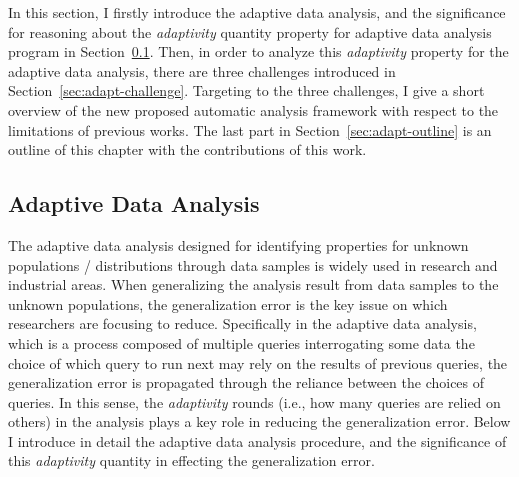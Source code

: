 In this section, 
I firstly introduce the adaptive data analysis, and the
significance for reasoning about the \emph{adaptivity} quantity property 
for adaptive data analysis program in Section~\ref{sec:adapt-background}.
Then, in order to analyze this \emph{adaptivity} property for the adaptive data analysis,
there are three challenges
introduced in Section~\ref{sec:adapt-challenge}.
Targeting to the three challenges, I give a short overview of the new proposed automatic analysis framework with respect to
the limitations of previous works.
The last part in Section~\ref{sec:adapt-outline} is an outline of this chapter with the contributions of this work.

 \subsection{Adaptive Data Analysis}
 \label{sec:adapt-background}The adaptive data analysis designed for identifying  properties for unknown populations / distributions 
 through data samples is widely 
 used in research and industrial areas.
 When generalizing the analysis result from data samples to the unknown populations, 
 the generalization error is the key issue on which researchers are focusing to reduce.
 Specifically in the adaptive data analysis,
 which is a process composed of 
 multiple queries interrogating some data
 the choice of which query to run next may rely on the results of previous queries,
 the generalization error is propagated through the reliance between the choices of queries.
 In this sense, the \emph{adaptivity} rounds (i.e., how many queries are relied on others) in the analysis plays a key role in reducing the generalization error.
 Below I introduce in detail the adaptive data analysis procedure,
 and the significance of this \emph{adaptivity} quantity in effecting the generalization error.
 
